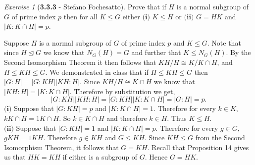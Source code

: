 \documentclass[12pt]{amsart}
\makeatletter
\theoremstyle{remark}
\newtheorem*{exercise}{Exercise}%
\renewenvironment{proof}[1][\proofname]{\par\doublespacing
  \pushQED{\qed}%
  \normalfont \topsep6\p@\@plus6\p@\relax
  \list{}{%
    \settowidth{\leftmargin}{\itshape\proofname:\hskip\labelsep}%
    \setlength{\labelwidth}{0pt}%
    \setlength{\itemindent}{-\leftmargin}%
  }%
  \item[\hskip\labelsep\itshape#1\@addpunct{:}]\ignorespaces
}{%
  \popQED\endlist\@endpefalse
  \singlespacing
}
\theoremstyle{mycomment}
\makeatother
\begin{document}
\begin{exercise}[\textbf{3.3.3} - Stefano Fochesatto] Prove that if $H$ is a normal subgroup of $G$ of prime index $p$ then for all $K \leq G$ either $\textbf{(i)}$ $K \leq H$ or $\textbf{(ii)}$ $G = HK$ and $|K: K \cap H| = p$.\\
  \begin{proof}
      Suppose $H$ is a normal subgroup of $G$ of prime index $p$ and $K \leq G$. Note that since $H \trianglelefteq G$ we know that $N_G(H) = G$ and further that $K \leq N_G(H)$. By the Second Isomorphism Theorem it then follows that $KH/H \cong K/K \cap H$, and $H \leq KH \leq G$. We demonstrated in class that if $H \leq KH \leq G$ then $|G:H| = |G:KH||KH:H|$. Since $KH/H \cong K \cap H$ we know that 
      $|KH:H| = |K:K\cap H|$. Therefore by substitution we get, 
      \begin{equation*}
        |G:KH||KH:H| = |G:KH||K:K\cap H| = |G:H| = p.
      \end{equation*}
      $\textbf{(i)}$ Suppose that $|G:KH| = p$ and $|K:K\cap H| = 1$. Therefore for every $k \in K$, $k K \cap H = 1  K \cap H$. So $k \in K \cap H$ and therefore $k \in H$. Thus $K \leq H$.\\

      \noindent $\textbf{(ii)}$ Suppose that $|G:KH| = 1$ and $|K:K\cap H| = p$. Therefore for every $g \in G$, $gKH = 1KH$. Therefore $g \in KH$ and $G \leq KH$. Since $KH \leq G$ from the Second Isomorphism Theorem, it follows that $G = KH$. Recall that Proposition 14 gives us that $HK = KH$ if either is a subgroup of $G$. Hence $G = HK$. 
    \end{proof}
\end{exercise}
\vspace{.15in}
\end{document}
